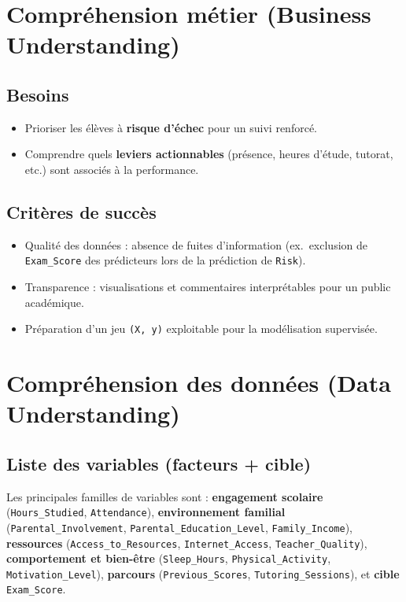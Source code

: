 \documentclass[a4paper,11pt]{article}
\begin{document}
\section{Compréhension métier (Business Understanding)}

\subsection{Besoins}
\begin{itemize}[leftmargin=*]
  \item Prioriser les élèves à \textbf{risque d'échec} pour un suivi renforcé.
  \item Comprendre quels \textbf{leviers actionnables} (présence, heures d'étude, tutorat, etc.) sont associés à la performance.
\end{itemize}

\subsection{Critères de succès}
\begin{itemize}[leftmargin=*]
  \item Qualité des données : absence de fuites d'information (ex.\ exclusion de \texttt{Exam\_Score} des prédicteurs lors de la prédiction de \texttt{Risk}).
  \item Transparence : visualisations et commentaires interprétables pour un public académique.
  \item Préparation d'un jeu \texttt{(X, y)} exploitable pour la modélisation supervisée.
\end{itemize}

\section{Compréhension des données (Data Understanding)}

\subsection{Liste des variables (facteurs + cible)}
Les principales familles de variables sont : \textbf{engagement scolaire} (\texttt{Hours\_Studied}, \texttt{Attendance}), \textbf{environnement familial} (\texttt{Parental\_Involvement}, \texttt{Parental\_Education\_Level}, \texttt{Family\_Income}), \textbf{ressources} (\texttt{Access\_to\_Resources}, \texttt{Internet\_Access}, \texttt{Teacher\_Quality}), \textbf{comportement et bien-être} (\texttt{Sleep\_Hours}, \texttt{Physical\_Activity}, \texttt{Motivation\_Level}), \textbf{parcours} (\texttt{Previous\_Scores}, \texttt{Tutoring\_Sessions}), et \textbf{cible} \texttt{Exam\_Score}.
\end{document}
